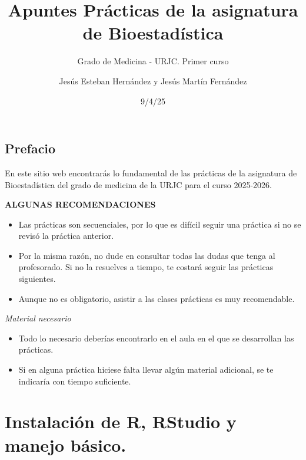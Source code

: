 \documentclass[
  letterpaper,
]{scrbook}
\title{Apuntes Prácticas de la asignatura de Bioestadística}
\subtitle{Grado de Medicina - URJC. Primer curso}
\author{Jesús Esteban Hernández y Jesús Martín Fernández}
\date{9/4/25}
\renewcommand*\contentsname{Tabla de contenidos}
\newcommand\contentsname{Tabla de contenidos}
\begin{document}
\frontmatter
\maketitle
\ifdefined\Shaded\renewenvironment{Shaded}{\begin{tcolorbox}[boxrule=0pt, frame hidden, interior hidden, borderline west={3pt}{0pt}{shadecolor}, breakable, enhanced, sharp corners]}{\end{tcolorbox}}\fi

\renewcommand*\contentsname{Tabla de contenidos}
{
\setcounter{tocdepth}{2}
\tableofcontents
}
\mainmatter
{}

\hypertarget{prefacio}{%
\chapter*{Prefacio}\label{prefacio}}


En este sitio web encontrarás lo fundamental de las prácticas de la
asignatura de Bioestadística del grado de medicina de la URJC para el
curso 2025-2026.

\textbf{ALGUNAS RECOMENDACIONES}

\begin{itemize}
\item
  Las prácticas son secuenciales, por lo que es difícil seguir una
  práctica si no se revisó la práctica anterior.
\item
  Por la misma razón, no dude en consultar todas las dudas que tenga al
  profesorado. Si no la resuelves a tiempo, te costará seguir las
  prácticas siguientes.
\item
  Aunque no es obligatorio, asistir a las clases prácticas es muy
  recomendable.
\end{itemize}

\emph{Material necesario}

\begin{itemize}
\item
  Todo lo necesario deberías encontrarlo en el aula en el que se
  desarrollan las prácticas.
\item
  Si en alguna práctica hiciese falta llevar algún material adicional,
  se te indicaría con tiempo suficiente.
\end{itemize}

\part{Instalación de R, RStudio y manejo básico.}
\end{document}
